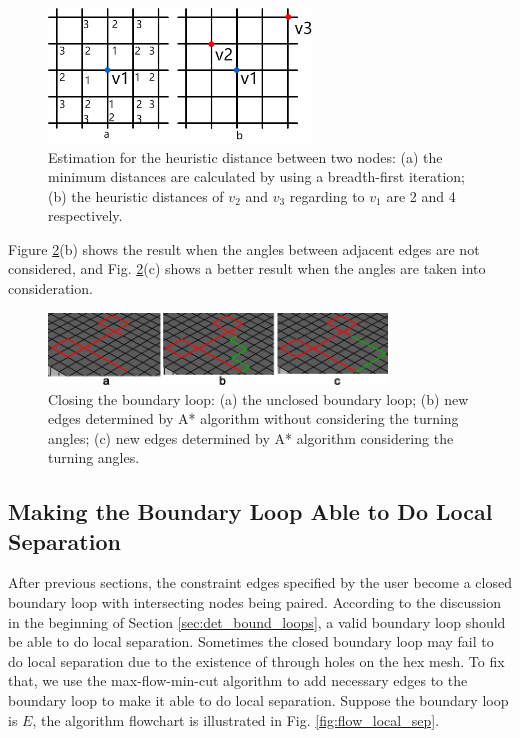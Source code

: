 \documentclass[final,5p,times,twocolumn]{elsarticle}
\begin{document}
\begin{figure}[htbp]
\begin{center}
\includegraphics[width=7cm]{rev_figures/A_start_estimation.png}
\caption{Estimation for the heuristic distance between two nodes: (a) the minimum distances are calculated by using a breadth-first iteration; (b) the heuristic distances of $v_2$ and $v_3$ regarding to $v_1$ are 2 and 4 respectively.}
\label{fig:A_start_estimation}
\end{center}
\end{figure}

Figure \ref{fig:close_loop}(b) shows the result when the angles between adjacent edges are not considered, and Fig. \ref{fig:close_loop}(c) shows a better result when the angles are taken into consideration.

\begin{figure}[htbp]
\begin{center}
\includegraphics[width=9cm]{figures/close_loop.png}
\caption{Closing the boundary loop: (a) the unclosed boundary loop; (b) new edges determined by A* algorithm without considering the turning angles; (c) new edges determined by A* algorithm considering the turning angles.}
\label{fig:close_loop}
\end{center}
\end{figure}

\subsection{Making the Boundary Loop Able to Do Local Separation}
\label{sec:local_separation}
After previous sections, the constraint edges specified by the user become a closed boundary loop with intersecting nodes being paired. According to the discussion in the beginning of Section \ref{sec:det_bound_loops}, a valid boundary loop should be able to do local separation. Sometimes the closed boundary loop may fail to do local separation due to the existence of through holes on the hex mesh. To fix that, we use the max-flow-min-cut algorithm to add necessary edges to the boundary loop to make it able to do local separation. Suppose the boundary loop is $E$, the algorithm flowchart is illustrated in Fig. \ref{fig:flow_local_sep}.
\end{document}

